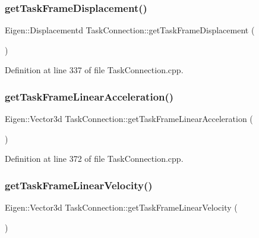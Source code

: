 \subsubsection{\texorpdfstring{get\+Task\+Frame\+Displacement()}{getTaskFrameDisplacement()}}
{\footnotesize\ttfamily Eigen\+::\+Displacementd Task\+Connection\+::get\+Task\+Frame\+Displacement (\begin{DoxyParamCaption}{ }\end{DoxyParamCaption})}



Definition at line 337 of file Task\+Connection.\+cpp.

\hypertarget{classocra__recipes_1_1TaskConnection_a4c489ec411ea7cb026213ac53111431d}{}\label{classocra__recipes_1_1TaskConnection_a4c489ec411ea7cb026213ac53111431d} 
\subsubsection{\texorpdfstring{get\+Task\+Frame\+Linear\+Acceleration()}{getTaskFrameLinearAcceleration()}}
{\footnotesize\ttfamily Eigen\+::\+Vector3d Task\+Connection\+::get\+Task\+Frame\+Linear\+Acceleration (\begin{DoxyParamCaption}{ }\end{DoxyParamCaption})}



Definition at line 372 of file Task\+Connection.\+cpp.

\hypertarget{classocra__recipes_1_1TaskConnection_ab0948b1336f171e607ca79ca03a466c5}{}\label{classocra__recipes_1_1TaskConnection_ab0948b1336f171e607ca79ca03a466c5} 
\subsubsection{\texorpdfstring{get\+Task\+Frame\+Linear\+Velocity()}{getTaskFrameLinearVelocity()}}
{\footnotesize\ttfamily Eigen\+::\+Vector3d Task\+Connection\+::get\+Task\+Frame\+Linear\+Velocity (\begin{DoxyParamCaption}{ }\end{DoxyParamCaption})}



